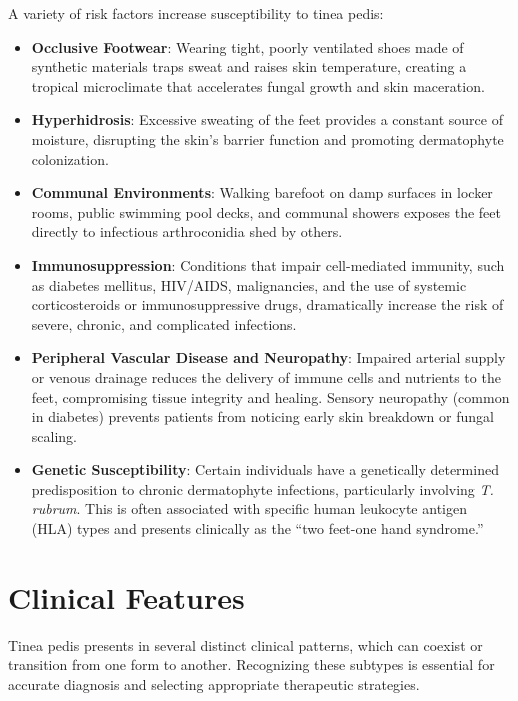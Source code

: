 A variety of risk factors increase susceptibility to tinea pedis:
\begin{itemize}
    \item \textbf{Occlusive Footwear}: Wearing tight, poorly ventilated shoes made of synthetic materials traps sweat and raises skin temperature, creating a tropical microclimate that accelerates fungal growth and skin maceration.
    \item \textbf{Hyperhidrosis}: Excessive sweating of the feet provides a constant source of moisture, disrupting the skin's barrier function and promoting dermatophyte colonization.
    \item \textbf{Communal Environments}: Walking barefoot on damp surfaces in locker rooms, public swimming pool decks, and communal showers exposes the feet directly to infectious arthroconidia shed by others.
    \item \textbf{Immunosuppression}: Conditions that impair cell-mediated immunity, such as diabetes mellitus, HIV/AIDS, malignancies, and the use of systemic corticosteroids or immunosuppressive drugs, dramatically increase the risk of severe, chronic, and complicated infections.
    \item \textbf{Peripheral Vascular Disease and Neuropathy}: Impaired arterial supply or venous drainage reduces the delivery of immune cells and nutrients to the feet, compromising tissue integrity and healing. Sensory neuropathy (common in diabetes) prevents patients from noticing early skin breakdown or fungal scaling.
    \item \textbf{Genetic Susceptibility}: Certain individuals have a genetically determined predisposition to chronic dermatophyte infections, particularly involving \textit{T. rubrum}. This is often associated with specific human leukocyte antigen (HLA) types and presents clinically as the ``two feet-one hand syndrome.''
\end{itemize}

\section*{Clinical Features}
Tinea pedis presents in several distinct clinical patterns, which can coexist or transition from one form to another. Recognizing these subtypes is essential for accurate diagnosis and selecting appropriate therapeutic strategies.


